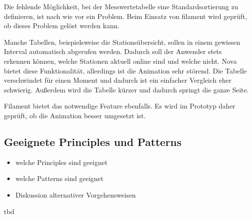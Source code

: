 \newpage

Die fehlende Möglichkeit, bei der Messwertetabelle eine Standardsortierung zu definieren, ist nach wie vor ein Problem.
Beim Einsatz von filament wird geprüft, ob dieses Problem gelöst werden kann.

Manche Tabellen, beispielsweise die Stationsübersicht, sollen in einem gewissen Interval automatisch abgerufen werden.
Dadurch soll der Anwender stets erkennen können, welche Stationen aktuell online sind und welche nicht.
Nova bietet diese Funktionalität, allerdings ist die Animation sehr störend.
Die Tabelle verschwindet für einen Moment und dadurch ist ein einfacher Vergleich eher schwierig.
Außerdem wird die Tabelle kürzer und dadurch springt die ganze Seite.

Filament bietet das notwendige Feature ebenfalls.
Es wird im Prototyp daher geprüft, ob die Animation besser umgesetzt ist.

\subsection{Geeignete Principles und Patterns}
\begin{itemize}
    \item welche Principles sind geeignet
    \item welche Patterns sind geeignet
    \item Diskussion alternativer Vorgehensweisen
\end{itemize}

tbd
